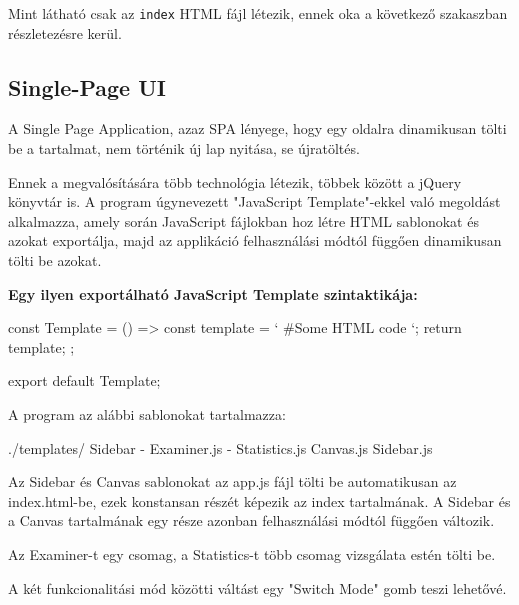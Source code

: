 Mint látható csak az \texttt{index} HTML fájl létezik, ennek oka a következő szakaszban részletezésre kerül.

\subsection{Single-Page UI}

A Single Page Application, azaz SPA lényege, hogy egy oldalra dinamikusan tölti be a tartalmat, nem történik új lap nyitása, se újratöltés.

Ennek a megvalósítására több technológia létezik, többek között a jQuery könyvtár is. A program úgynevezett "JavaScript Template"-ekkel való megoldást alkalmazza, amely során JavaScript fájlokban hoz létre HTML sablonokat és azokat exportálja, majd az applikáció felhasználási módtól függően dinamikusan tölti be azokat.

\pagebreak

\textbf{Egy ilyen exportálható JavaScript Template szintaktikája:}

\begin{cpp}
	const Template = () => {
		const template = `
		#Some HTML code
		`;
		return template;
	};

	export default Template;
\end{cpp}

A program az alábbi sablonokat tartalmazza:
\begin{cpp}
./templates/	
	Sidebar
	- Examiner.js
	- Statistics.js
	Canvas.js
	Sidebar.js
\end{cpp}

Az Sidebar és Canvas sablonokat az app.js fájl tölti be automatikusan az index.html-be, ezek konstansan részét képezik az index tartalmának. A Sidebar és a Canvas tartalmának egy része azonban felhasználási módtól függően változik. 

Az Examiner-t egy csomag, a Statistics-t több csomag vizsgálata estén tölti be.

A két funkcionalitási mód közötti váltást egy "Switch Mode" gomb teszi lehetővé.

